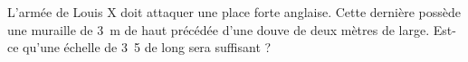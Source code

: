
\begin{exercice}\label{exosmath-0833}

    L'armée de Louis X doit attaquer une place forte anglaise. Cette dernière possède une muraille de \SI{3}{\meter} de haut précédée d'une douve de deux mètres de large. Est-ce qu'une échelle de \unit{3.5}{\meter} de long sera suffisant ?

\end{exercice}
